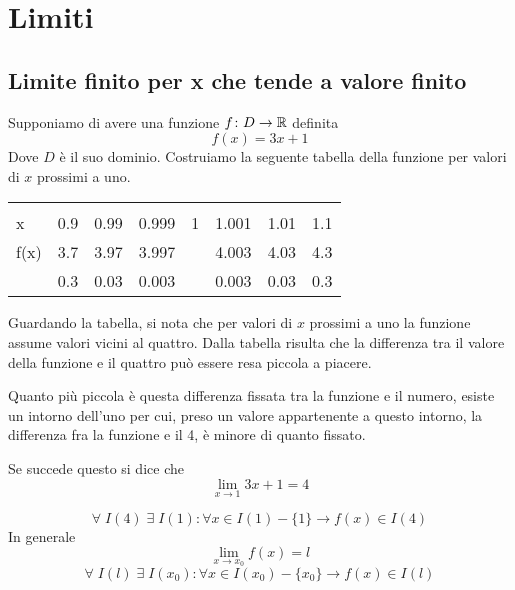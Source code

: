\chapter{Limiti}
\section{Limite finito per x che tende a valore finito}
Supponiamo di avere una funzione $f\colon D\to{}\mathbb{R}$ definita \[f(x)=3x+1\] Dove $D$ è il suo dominio. Costruiamo la seguente tabella della funzione per valori di $x$ prossimi a uno.
\begin{center}
\begin{tabular}{@{}L*{7}{c}}
	\toprule
&&	&&\\
x	& 0.9 & 0.99 & 0.999&1 &1.001  &1.01  & 1.1 \\
\cmidrule(r){2-8} 
f(x)	&3.7  & 3.97 &3.997 & & 4.003 & 4.03 & 4.3 \\ 
\cmidrule(r){2-8} 
& 0.3 &0.03  &0.003  &  & 0.003 &0.03& 0.3 \\ 
\bottomrule
\end{tabular}
\end{center}
Guardando la tabella, si nota che per valori di $x$ prossimi a uno la funzione assume valori vicini al  quattro. Dalla tabella risulta che la differenza tra il valore della funzione e il quattro può essere resa piccola a piacere.\par Quanto più piccola è questa differenza fissata tra la funzione e il numero, esiste un intorno dell'uno per cui, preso un valore appartenente a questo intorno, la differenza fra la funzione e il 4,  è minore di quanto fissato. 

Se succede questo si dice che \[\lim_{x\to 1}3x+1=4 \]

\begin{equation*}
\forall\; I(4)\; \exists\; I(1) : \forall x\in I(1)-\lbrace 1\rbrace \longrightarrow f(x)\in I(4)
\end{equation*}
In generale \begin{equation*}
\lim_{x\to x_0}f(x)=l
\end{equation*}
\begin{equation*}
\forall\; I(l)\; \exists\; I(x_0) : \forall x\in I(x_0)-\lbrace x_0\rbrace \longrightarrow f(x)\in I(l)
\end{equation*}

